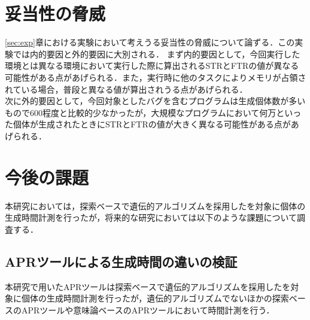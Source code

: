 \documentclass[uplatex,dvipdfmx,a4paper]{jsarticle}
\begin{document}
\clearpage
\section{妥当性の脅威}\label{sec:threat}
\ref{sec:exp}章における実験において考えうる妥当性の脅威について論ずる．この実験では内的要因と外的要因に大別される．
まず内的要因として，今回実行した環境とは異なる環境において実行した際に算出されるSTRとFTRの値が異なる可能性がある点があげられる．また，実行時に他のタスクによりメモリが占領されている場合，普段と異なる値が算出されうる点があげられる．\\
次に外的要因として，今回対象としたバグを含むプログラムは生成個体数が多いもので600程度と比較的少なかったが，大規模なプログラムにおいて何万といった個体が生成されたときにSTRとFTRの値が大きく異なる可能性がある点があげられる．
\clearpage
\section{今後の課題}\label{sec:ftrclg}
本研究においては，探索ベースで遺伝的アルゴリズムを採用した\kgp を対象に個体の生成時間計測を行ったが，将来的な研究においては以下のような課題について調査する．
\subsection{APRツールによる生成時間の違いの検証}
本研究で用いたAPRツールは探索ベースで遺伝的アルゴリズムを採用した\kgp を対象に個体の生成時間計測を行ったが，遺伝的アルゴリズムでないほかの探索ベースのAPRツールや意味論ベースのAPRツールにおいて時間計測を行う．
\end{document}
